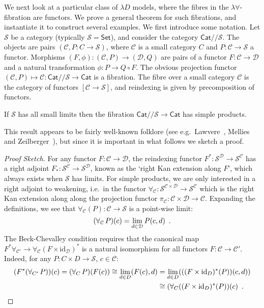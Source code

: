 \documentclass[a4paper,UKenglish]{lipics}
\newcommand{\msf}[1]{\mathsf{#1}} %
\newcommand{\Set}{\msf{Set}}
\newcommand{\Cat}{\msf{Cat}}
\newcommand{\C}{\mathcal{C}}
\newcommand{\D}{\mathcal{D}}
\newcommand{\lslice}{/\!/}
\newcommand{\id}{\mathrm{id}}
\begin{document}
We next look at a particular class of $\lambda D$ models, where the fibres in the $\lambda \forall$-fibration are functors. We prove a general theorem for such fibrations, and instantiate it to construct several examples. We first introduce some notation. Let $\mathcal S$ be a category (typically $\mathcal S=\Set$), and consider the category $\Cat\lslice\mathcal S$. The objects are pairs $(\C,P:C\to \mathcal S)$, where $\C$ is a small category $C$ and $P:\C\to \mathcal S$ a functor.  Morphisms $(F,\phi):(\C,P)\to (\D,Q)$ are pairs of a functor $F:\C\to \D$ and a natural transformation $\phi : P \to Q \circ F$.  The obvious projection functor $(\C,P)\mapsto \C : \Cat\lslice \mathcal S\to \Cat$ is a fibration. The fibre over a small category $\C$ is the category of functors $[\C\to\mathcal S]$, and reindexing is given by precomposition of functors.
\begin{theorem}
\label{thm:BC}
If $\mathcal S$ has all small limits
then the fibration $\Cat\lslice \mathcal S\to \Cat$ has simple products.
\end{theorem}

This result appears to be fairly well-known folklore (see e.g.\ Lawvere~\cite[end of \S 3]{lawvere-adjointness}, Mellies and Zeilberger~\cite{mellies-zeilberger}), but since it is important in what follows we sketch a proof.

\begin{proof}[Proof Sketch]
For any functor $F:\C\to \D$, the reindexing functor $F^*:\mathcal S^\D\to \mathcal S^\C$ has a right adjoint $F_*:\mathcal S^\C\to\mathcal S^\D$, known as the `right Kan extension along $F$', which always exists when $\mathcal S$ has limits. For simple products, we are only interested in a right adjoint to weakening, i.e.\ in the functor $\forall_\C:\mathcal S^{\C\times \D}\to \mathcal S^\C$ which is the right Kan extension along along the projection functor $\pi_\C:\C\times \D\to \C$. Expanding the definitions, we see that $\forall_\C(P):\C\to\mathcal S$ is a point-wise limit:
\begin{equation}
(\forall_\C\,P)(c)=\lim_{d\in \D}P(c,d)\enspace\text.
\label{eqn:forall-limit}
\end{equation}
The Beck-Chevalley condition requires that the canonical map
$
F^*\forall_{\C'}
\to
\forall_{\C}(F\times \id_\D)^*
$
is a natural isomorphism for all functors $F:\C\to \C'$. Indeed, for any $P:C\times D\to \mathcal S$, $c\in \mathcal C$:
\begin{align*}
(F^*(\forall_{C'}\,P))(c)
 =
(\forall_C\,P)(F(c))
\cong
\lim_{d\in D}(F(c),d)
 & =
\lim_{d\in D}(((F\times \id_D)^*(P))(c,d)) \\
 & \cong
(\forall_{C}((F\times \id_D)^*(P))(c)
\enspace \text. \qedhere
\end{align*}
\end{proof}
\end{document}
